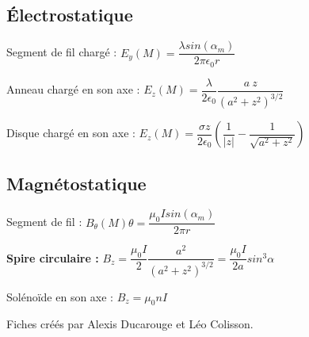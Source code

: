 \documentclass[9pt]{article}
\begin{document}
\begin{multicols*}{2}
\subsection{Électrostatique}

Segment de fil chargé : $E_{y}(M)=\dfrac{\lambda sin(\alpha_{m})}{2 \pi \epsilon_{0} r}$

Anneau chargé en son axe : $E_{z}(M)=\dfrac{\lambda}{2 \epsilon_{0}}\dfrac{a \> z}{(a^{2}+z^{2})^{3/2}}$

Disque chargé en son axe : $E_{z}(M)=\dfrac{\sigma z}{2 \epsilon_{0}}(\dfrac{1}{|z|}-\dfrac{1}{\sqrt{a^{2}+z^{2}}})$


\subsection{Magnétostatique}

Segment de fil : $B_{\theta}(M)\theta=\dfrac{\mu_{0}Isin(\alpha_{m})}{2\pi r}$

\textbf{Spire circulaire :} $B_{z}=\dfrac{\mu_{0}I}{2}\dfrac{a^{2}}{(a^{2}+z^{2})^{3/2}}=\dfrac{\mu_{0}I}{2a}sin^{3}\alpha$

Solénoïde en son axe : $B_{z}=\mu_{0}nI$

\footnotesize{Fiches créés par Alexis Ducarouge et Léo Colisson.}

\end{multicols*}
\end{document}
